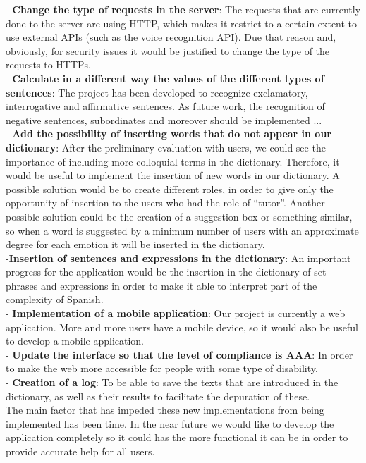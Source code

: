 - \textbf{Change the type of requests in the server}: The requests that are currently done to the server are using HTTP, which makes it restrict to a certain extent to use external APIs (such as the voice recognition API). Due that reason and, obviously, for security issues it would be justified to change the type of the requests to HTTPs.\\



- \textbf{Calculate in a different way the values of the different types of sentences}: The project has been developed to recognize exclamatory, interrogative and affirmative sentences. As future work, the recognition of negative sentences, subordinates and moreover should be implemented ...\\


- \textbf{Add the possibility of inserting words that do not appear in our dictionary}: After the preliminary evaluation with users, we could see the importance of including more colloquial terms in the dictionary. Therefore, it would be useful to implement the insertion of new words in our dictionary. A possible solution would be to create different roles, in order to give only the opportunity of insertion to the users who had the role of ``tutor''. Another possible solution could be the creation of a suggestion box or something similar, so when a word is suggested by a minimum number of users with an approximate degree for each emotion it will be inserted in the dictionary.\\


-\textbf{Insertion of sentences and expressions in the dictionary}: An important progress for the application would be the insertion in the dictionary of set phrases and expressions in order to make it able to interpret part of the complexity of Spanish.\\



- \textbf{Implementation of a mobile application}: Our project is currently a web application. More and more users have a mobile device, so it would also be useful to develop a mobile application.\\

- \textbf{Update the interface so that the level of compliance is AAA}: In order to make the web more accessible for people with some type of disability.\\



- \textbf{Creation of a log}: To be able to save the texts that are introduced in the dictionary, as well as their results to facilitate the depuration of these.\\


The main factor that has impeded these new implementations from being implemented has been time. In the near future we would like to develop the application completely so it could has the more functional it can be in order to provide accurate help for all users.\\


